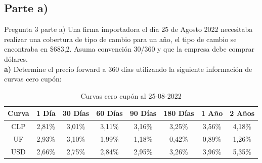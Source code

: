 \documentclass{beamer}
\begin{document}
\subsection{Parte a)}
\begin{frame}{Pregunta 3 parte a)}
  Una firma importadora el día 25 de Agosto 2022 necesitaba realizar una cobertura de tipo de cambio 
para un año, el tipo de cambio se encontraba en \$683,2. Asuma convención 30/360 y que la empresa debe comprar dólares.\\
\textbf{a)} Determine el precio forward a 360 días utilizando la siguiente información de curvas cero cupón:
\begin{table}[h!]
    \centering
    \scriptsize %
    \caption{Curvas cero cupón al 25-08-2022}
    \begin{tabular}{|c|c|c|c|c|c|c|c|}
    \hline
    \textbf{Curva} & \textbf{1 Día} & \textbf{30 Días} & \textbf{60 Días} & \textbf{90 Días} & \textbf{180 Días} & \textbf{1 Año} & \textbf{2 Años} \\
    \hline
    CLP & 2{,}81\% & 3{,}01\% & 3{,}11\% & 3{,}16\% & 3{,}25\% & 3{,}56\% & 4{,}18\% \\
    UF  & 2{,}93\% & 3{,}10\% & 1{,}99\% & 1{,}18\% & 0{,}42\% & 0{,}89\% & 1{,}26\% \\
    USD & 2{,}66\% & 2{,}75\% & 2{,}84\% & 2{,}95\% & 3{,}26\% & 3{,}96\% & 5{,}35\% \\
    \hline
    \end{tabular}
\end{table}
\end{frame}
\end{document}
